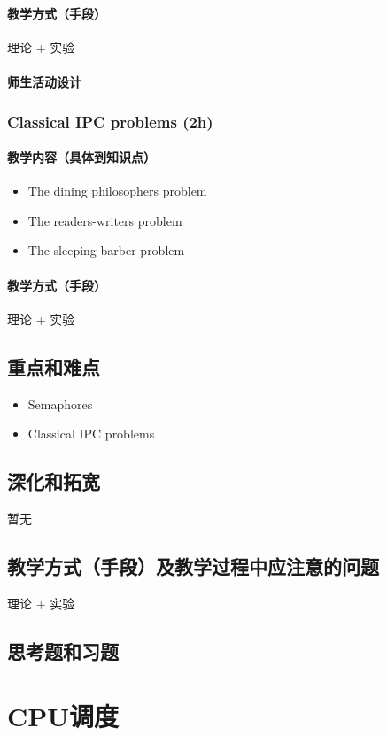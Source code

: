\documentclass[11pt]{article}
\begin{document}
\paragraph{教学方式（手段）}
\label{sec-3-2-6-2}
理论 + 实验
\paragraph{师生活动设计}
\label{sec-3-2-6-3}
\subsubsection{Classical IPC problems (2h)}
\label{sec-3-2-7}
\paragraph{教学内容（具体到知识点）}
\label{sec-3-2-7-1}
\begin{itemize}
\item The dining philosophers problem
\item The readers-writers problem
\item The sleeping barber problem
\end{itemize}
\paragraph{教学方式（手段）}
\label{sec-3-2-7-2}
理论 + 实验
\subsection{重点和难点}
\label{sec-3-3}
\begin{itemize}
\item Semaphores
\item Classical IPC problems
\end{itemize}
\subsection{深化和拓宽}
\label{sec-3-4}
暂无
\subsection{教学方式（手段）及教学过程中应注意的问题}
\label{sec-3-5}
理论 + 实验
\subsection{思考题和习题}
\label{sec-3-6}
\section{CPU调度}
\label{sec-4}
\end{document}
